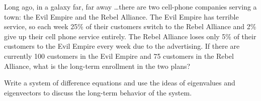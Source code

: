 \begin{problem}
    Long ago, in a galaxy far, far away \dots there are two cell-phone companies serving a
    town: the Evil Empire and the Rebel Alliance. The Evil Empire has terrible service, so
    each week 25\% of their customers switch to the Rebel Alliance and 2\% give up their
    cell phone service entirely. The Rebel Alliance loses only 5\% of their customers to
    the Evil Empire every week due to the advertising.  If there are currently 100
    customers in the Evil Empire and 75 customers in the Rebel Alliance, what is the
    long-term enrollment in the two plans?

    Write a system of difference equations and use the ideas of eigenvalues and
    eigenvectors to discuss the long-term behavior of the system.
\end{problem}

